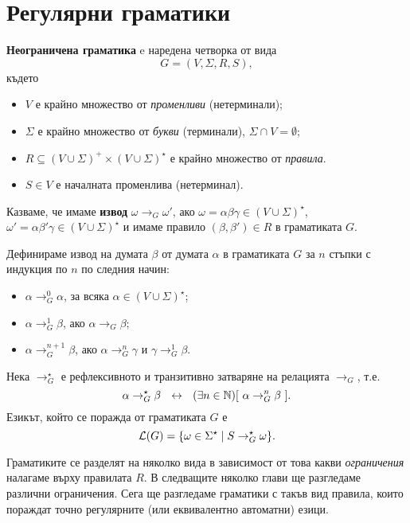 \section{Регулярни граматики}
\label{sect:regular-grammar}
{\bf Неограничена граматика} e наредена четворка от вида
\[G = (V, \Sigma, R, S),\]
където
\begin{itemize}
\item
  $V$ е крайно множество от {\em променливи} (нетерминали);
\item
  $\Sigma$ е крайно множество от {\em букви} (терминали), $\Sigma \cap V = \emptyset$;
\item
  $R \subseteq (V\cup\Sigma)^+ \times (V \cup \Sigma)^\star$ е крайно множество от {\em правила}.
\item
  $S \in V$ е началната променлива (нетерминал). 
\end{itemize}
Казваме, че имаме {\bf извод} $\omega \to_G \omega'$, ако $\omega = \alpha\beta\gamma \in (V\cup\Sigma)^\star$,
$\omega' = \alpha\beta'\gamma \in (V\cup\Sigma)^\star$ и имаме правило $(\beta,\beta') \in R$ в граматиката $G$.

Дефинираме извод на думата $\beta$ от думата $\alpha$ в граматиката $G$ за $n$ стъпки с индукция по $n$ по следния начин:
\begin{itemize}
\item
  $\alpha \to^0_G \alpha$, за всяка $\alpha \in (V \cup \Sigma)^\star$;
\item
  $\alpha \to^1_G \beta$, ако $\alpha \to_G \beta$;
\item
  $\alpha \to^{n+1}_G \beta$, ако $\alpha \to^n_G \gamma$ и $\gamma \to^1_G \beta$.
\end{itemize}
Нека $\to^\star_G$ е рефлексивното и транзитивно затваряне на релацията $\to_G$, т.е.
\[ \alpha \to^\star_G \beta\ \iff\ (\exists n\in\Nat)[\ \alpha \to^n_G \beta\ ].\]
Езикът, който се поражда от граматиката $G$ е
\[\mathcal{L}(G) = \{\omega \in \Sigma^\star \mid S \to^\star_G \omega\}.\]

Граматиките се разделят на няколко вида в зависимост от това какви {\em ограничения} налагаме върху правилата $R$.
В следващите няколко глави ще разгледаме различни ограничения. Сега ще разгледаме граматики с такъв вид правила,
които пораждат точно регулярните (или еквивалентно автоматни) езици.

